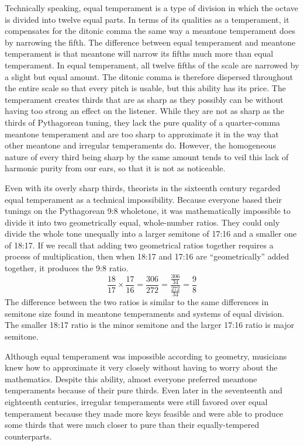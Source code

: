 Technically speaking, equal temperament is a type of division in which the octave is
divided into twelve equal parts.  In terms of its qualities as a temperament, it
compensates for the ditonic comma the same way a meantone temperament does by narrowing
the fifth. The difference between equal temperament and meantone temperament is that
meantone will narrow its fifths much more than equal temperament.  In equal
temperament, all twelve fifths of the scale are narrowed by a slight but equal amount.
The ditonic comma is therefore dispersed throughout the entire scale so that every
pitch is usable, but this ability has its price.  The temperament creates thirds that
are as sharp as they possibly can be without having too strong an effect on the
listener.  While they are not as sharp as the thirds of Pythagorean tuning, they lack
the pure quality of a quarter-comma meantone temperament and are too sharp to
approximate it in the way that other meantone and irregular temperaments do. However,
the homogeneous nature of every third being sharp by the same amount tends to veil this
lack of harmonic purity from our ears, so that it is not as noticeable.

Even with its overly sharp thirds, theorists in the sixteenth century regarded equal
temperament as a technical impossibility. Because everyone based their tunings on the
Pythagorean 9:8 wholetone, it was mathematically impossible to divide it into two
geometrically equal, whole-number ratios. They could only divide the whole tone
unequally into a larger semitone of 17:16 and a smaller one of 18:17.
\autocite[20]{ML:1} If we recall that adding two geometrical ratios together requires a
process of multiplication, then when 18:17 and 17:16 are ``geometrically'' added
together, it produces the 9:8 ratio.
\begin{equation}
  \frac{18}{17} \times
  \frac{17}{16} =
  \frac{306}{272} =
  \frac{\frac{306}{34}}{\frac{272}{34}} =
  \frac{9}{8}
\end{equation}
The difference between the two ratios is similar to the same differences in semitone size
found in meantone temperaments and systems of equal division.  The smaller 18:17 ratio is
the minor semitone and the larger 17:16 ratio is major semitone.

Although equal temperament was impossible according to geometry, musicians knew
how to approximate it very closely without having to worry about the mathematics.
Despite this ability, almost everyone preferred meantone temperaments because of
their pure thirds. Even later in the seventeenth and eighteenth centuries,
irregular temperaments were still favored over equal temperament because they
made more keys feasible and were able to produce some thirds that were much
closer to pure than their equally-tempered counterparts.

